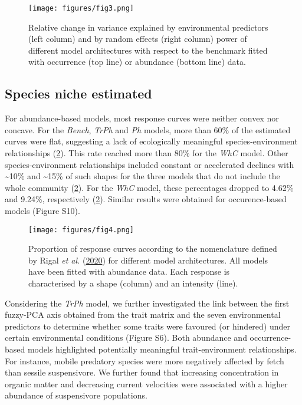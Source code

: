 \documentclass[9pt,biorxiv,doublespacing,lineno,endfloat]{lapreprint}
\begin{document}
\begin{figure}
\hypertarget{fig:fig3}{%
\centering
\texttt{[image: figures/fig3.png]}
\caption{Relative change in variance explained by environmental
predictors (left column) and by random effects (right column) power of
different model architectures with respect to the benchmark fitted with
occurrence (top line) or abundance (bottom line) data.}\label{fig:fig3}
}
\end{figure}

\hypertarget{species-niche-estimated}{%
\subsection{Species niche estimated}\label{species-niche-estimated}}

For abundance-based models, most response curves were neither convex nor
concave. For the \emph{Bench}, \emph{TrPh} and \emph{Ph} models, more
than 60\% of the estimated curves were flat, suggesting a lack of
ecologically meaningful species-environment relationships
(\cref{fig:fig4}). This rate reached more than 80\% for the \emph{WhC}
model. Other species-environment relationships included constant or
accelerated declines with \textasciitilde10\% and \textasciitilde15\% of
such shapes for the three models that do not include the whole community
(\cref{fig:fig4}). For the \emph{WhC} model, these percentages dropped
to 4.62\% and 9.24\%, respectively (\cref{fig:fig4}). Similar results
were obtained for occurence-based models (Figure S10).

\begin{figure}
\hypertarget{fig:fig4}{%
\centering
\texttt{[image: figures/fig4.png]}
\caption{Proportion of response curves according to the nomenclature
defined by Rigal \emph{et al.}
(\protect\hyperlink{ref-Rigal_2020}{2020}) for different model
architectures. All models have been fitted with abundance data. Each
response is characterised by a shape (column) and an intensity
(line).}\label{fig:fig4}
}
\end{figure}

Considering the \emph{TrPh} model, we further investigated the link
between the first fuzzy-PCA axis obtained from the trait matrix and the
seven environmental predictors to determine whether some traits were
favoured (or hindered) under certain environmental conditions (Figure
S6). Both abundance and occurrence-based models highlighted potentially
meaningful trait-environment relationships. For instance, mobile
predatory species were more negatively affected by fetch than sessile
suspensivore. We further found that increasing concentration in organic
matter and decreasing current velocities were associated with a higher
abundance of suspensivore populations.
\end{document}
